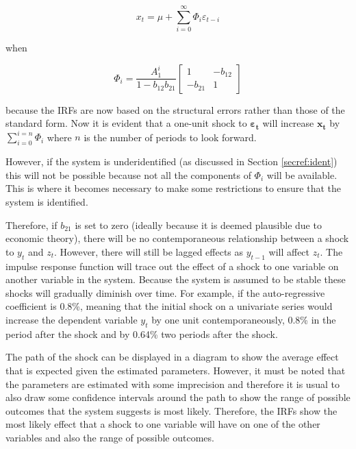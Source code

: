 \documentclass[12pt, a4paper, oneside]{article}\usepackage[]{graphicx}\usepackage[]{color}
\begin{document}
\begin{equation}
x_t=\mu + \sum_{i=0}^{\infty} \Phi_i \varepsilon_{t-i}
\end{equation}

when

\begin{equation}
\Phi_i=\frac{A_1^i}{1 - b_{12}b_{21}}
\begin{bmatrix} 1 & -b_{12} \\ -b_{21} & 1 
\end{bmatrix} 
\end{equation}

because the IRFs are now based on the structural errors rather than those of the standard form.  Now it is evident that a one-unit shock to $\mathbf{\varepsilon_t}$ will increase $\mathbf{x_t}$ by $\sum_{i=0}^{i=n}\Phi_i$ where $n$ is the number of periods to look forward.  

However, if the system is underidentified (as discussed in Section \ref{secref:ident}) this will not be possible because not all the components of $\Phi_i$ will be available.  This is where it becomes necessary to make some restrictions to ensure that the system is identified. 

Therefore, if $b_{21}$ is set to zero (ideally because it is deemed plausible due to economic theory), there will be no contemporaneous relationship between a shock to $y_t$ and $z_t$.  However, there will still be lagged effects as $y_{t-1}$ will affect $z_t$.  The impulse response function will trace out the effect of a shock to one variable on another variable in the system.  Because the system is assumed to be stable these shocks will gradually diminish over time.  For example, if the auto-regressive coefficient is 0.8\%, meaning that the initial shock on a univariate series would increase the dependent variable $y_t$ by one unit contemporaneously, 0.8\% in the period after the shock and by 0.64\% two periods after the shock.  

The path of the shock can be displayed in a diagram to show the average effect that is expected given the estimated parameters.  However, it must be noted that the parameters are estimated with some imprecision and therefore it is usual to also draw some confidence intervals around the path to show the range of possible outcomes that the system suggests is most likely.  Therefore, the IRFs show the most likely effect that a shock to one variable will have on one of the other variables and also the range of possible outcomes.   
\end{document}
